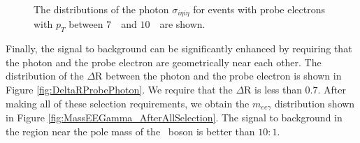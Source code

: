 \documentclass{cmspaper}
\begin{document}
\begin{figure}[htb]
  \begin{center}
    \caption{ The distributions of the photon $\sigma_{i\eta i\eta}$ for events with probe electrons with $p_{T}$
      between $7$~\GeV\ and $10$~\GeV\ are shown. 
    }
    \label{fig:PhotonSigmaIEtaIEta_LowPtProbes}
  \end{center}
\end{figure} 


Finally, the signal to background can be significantly enhanced by requiring that the photon and the probe 
electron are geometrically near each other. The distribution of the $\Delta$R between the photon and the
probe electron is shown in Figure \ref{fig:DeltaRProbePhoton}. We require that the $\Delta$R is less
than $0.7$. After making all of these selection requirements, we obtain the $m_{ee\gamma}$ distribution
shown in Figure \ref{fig:MassEEGamma_AfterAllSelection}. The signal to background in the region near the 
pole mass of the \Z\ boson is better than $10:1$. 
\end{document}
